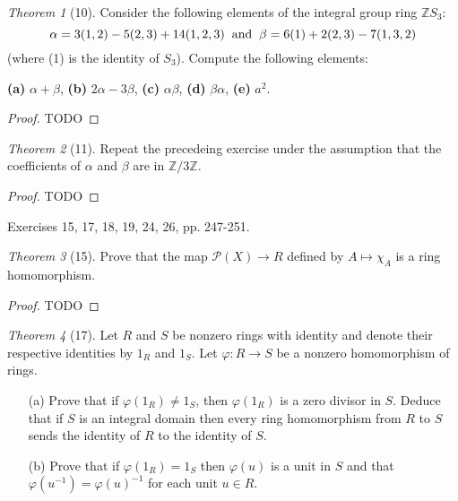 \documentclass[12pt]{article}
\theoremstyle{remark}
\theoremstyle{named}
\newtheorem*{theorem}{Theorem}
\renewcommand{\a}{\alpha}
\renewcommand{\b}{\beta}
\newcommand{\Z}{\mathbb Z}
\begin{document}
\begin{theorem}[10]
    Consider the following elements of the integral group ring \(\Z S_3\):
    \[\a = 3(1, 2) - 5(2, 3) + 14(1, 2, 3) \hspace{2mm} \text{and} \hspace{2mm} \b = 6(1) + 2(2, 3) - 7(1, 3, 2)\]
    (where (1) is the identity of \(S_3\)). Compute the following elements:

    \textbf{(a)} \(\a + \b\), \textbf{(b)} \(2\a - 3\b\), \textbf{(c)} \(\a \b\), \textbf{(d)} \(\b\a\), \textbf{(e)} \(a^2\).
\end{theorem}

\begin{proof}
    TODO
\end{proof}

\begin{theorem}[11]
    Repeat the precedeing exercise under the assumption that the coefficients of \(\a\) and \(\b\) are in \(\Z / 3\Z\).
\end{theorem}

\begin{proof}
    TODO
\end{proof}

Exercises 15, 17, 18, 19, 24, 26, pp. 247-251.

\begin{theorem}[15]
    Prove that the map \(\mathcal P(X) \to R\) defined by \(A \mapsto \chi_A\) is a ring homomorphism.
\end{theorem}

\begin{proof}
    TODO
\end{proof}

\begin{theorem}[17]
    Let \(R\) and \(S\) be nonzero rings with identity and denote their respective identities by \(1_R\) and \(1_S\). Let \(\varphi : R \to S\) be a nonzero homomorphism of rings. 
    \begin{enumerate}
        \item[(a)] Prove that if \(\varphi(1_R) \neq 1_S\), then \(\varphi(1_R)\) is a zero divisor in \(S\). Deduce that if \(S\) is an integral domain then every ring homomorphism from \(R\) to \(S\) sends the identity of \(R\) to the identity of \(S\). 
        \item[(b)] Prove that if \(\varphi(1_R) = 1_S\) then \(\varphi(u)\) is a unit in \(S\) and that \(\varphi(u^{-1}) = \varphi(u)^{-1}\) for each unit \(u \in R\). 
    \end{enumerate}
\end{theorem}
\end{document}
